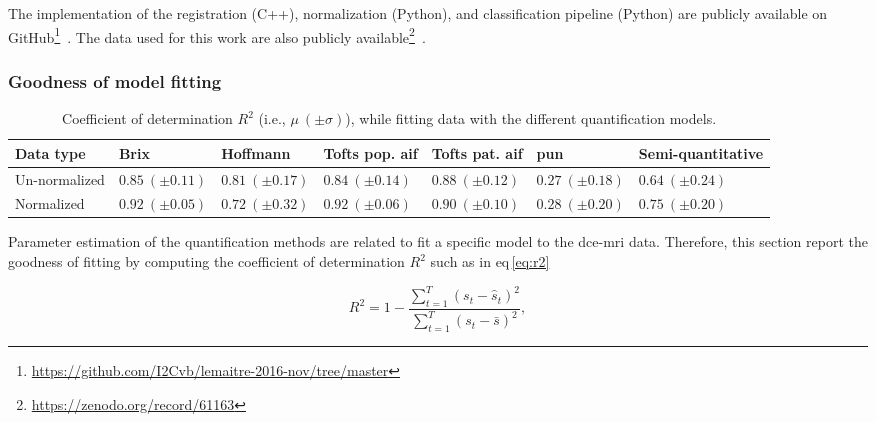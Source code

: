 The implementation of the registration (C++), normalization (Python), and classification pipeline (Python) are publicly available on GitHub\footnote{\url{https://github.com/I2Cvb/lemaitre-2016-nov/tree/master}}~\cite{lemaitre2016github}.
The data used for this work are also publicly available\footnote{\url{https://zenodo.org/record/61163}}~\cite{lemaitre2016dce}.



\subsubsection{Goodness of model fitting}\label{subsubsec:chp5:DCE-norm:Good}


\begin{table}
  \caption{Coefficient of determination $R^{2}$ (i.e., $\mu \ (\pm \sigma)$), while fitting data with the different quantification models.}
  \centering
  \scriptsize
  \begin{tabularx}{\textwidth}{lXXXXXX}
    \toprule
    \textbf{Data type} & \textbf{Brix} & \textbf{Hoffmann} & \textbf{Tofts pop. \acs*{aif}} & \textbf{Tofts pat. \acs*{aif}} & \textbf{\acs*{pun}} & \textbf{Semi-quantitative} \\
    \midrule
    Un-normalized & $0.85 \ (\pm 0.11)$ & $0.81 \ (\pm 0.17)$ & $0.84 \ (\pm 0.14)$ & $0.88 \ (\pm 0.12)$ & $0.27 \ (\pm 0.18)$ & $0.64 \ (\pm 0.24)$  \\
    Normalized    & $0.92 \ (\pm 0.05)$ & $0.72 \ (\pm 0.32)$ & $0.92 \ (\pm 0.06)$ & $0.90 \ (\pm 0.10)$ & $0.28 \ (\pm 0.20)$ & $0.75 \ (\pm 0.20)$  \\
    \bottomrule
  \end{tabularx}
  \label{tab:r2}
\end{table}

Parameter estimation of the quantification methods are related to fit a specific model to the \ac{dce}-\ac{mri} data.
Therefore, this section report the goodness of fitting by computing the coefficient of determination $R^2$ such as in \acs{eq}\,\eqref{eq:r2}

\begin{equation}
  R^2 = 1 - \frac{\sum_{t = 1}^{T} (s_t - \hat{s}_t)^2}{\sum_{t = 1}^{T} (s_t - \bar{s})^2} ,
  \label{eq:r2}
\end{equation}

